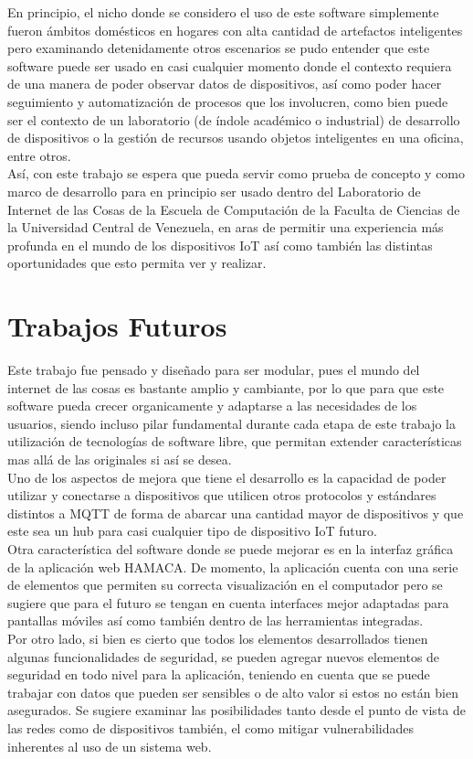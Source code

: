 En principio, el nicho donde se considero el uso de este software simplemente fueron ámbitos domésticos en hogares con alta cantidad de artefactos inteligentes pero examinando detenidamente otros escenarios se pudo entender que este software puede ser usado en casi cualquier momento donde el contexto requiera de una manera de poder observar datos de dispositivos, así como poder hacer seguimiento y automatización de procesos que los involucren, como bien puede ser el contexto de un laboratorio (de índole académico o industrial) de desarrollo de dispositivos o la gestión de recursos usando objetos inteligentes en una oficina, entre otros.\\
 
Así, con este trabajo se espera que pueda servir como prueba de concepto y como marco de desarrollo para en principio ser usado dentro del Laboratorio de Internet de las Cosas de la Escuela de Computación de la Faculta de Ciencias de la Universidad Central de Venezuela, en aras de permitir una experiencia más profunda en el mundo de los dispositivos IoT así como también las distintas oportunidades que esto permita ver y realizar. 

\section{Trabajos Futuros}
Este trabajo fue pensado y diseñado para ser modular, pues el mundo del internet de las cosas es bastante amplio y cambiante, por lo que para que este software pueda crecer organicamente y adaptarse a las necesidades de los usuarios, siendo incluso pilar fundamental durante cada etapa de este trabajo la utilización de tecnologías de software libre, que permitan extender características mas allá de las originales si así se desea.\\

Uno de los aspectos de mejora que tiene el desarrollo es la capacidad de poder utilizar y conectarse a dispositivos que utilicen otros protocolos y estándares distintos a MQTT de forma de abarcar una cantidad mayor de dispositivos y que este sea un hub para casi cualquier tipo de dispositivo IoT futuro.\\

Otra característica del software donde se puede mejorar es en la interfaz gráfica de la aplicación web HAMACA. De momento, la aplicación cuenta con una serie de elementos que permiten su correcta visualización en el computador pero se sugiere que para el futuro se tengan en cuenta interfaces mejor adaptadas para pantallas móviles así como también dentro de las herramientas integradas.\\

Por otro lado, si bien es cierto que todos los elementos desarrollados tienen algunas funcionalidades de seguridad, se pueden agregar nuevos elementos de seguridad en todo nivel para la aplicación, teniendo en cuenta que se puede trabajar con datos que pueden ser sensibles o de alto valor si estos no están bien asegurados. Se sugiere examinar las posibilidades tanto desde el punto de vista de las redes como de dispositivos también, el como mitigar vulnerabilidades inherentes al uso de un sistema web. 